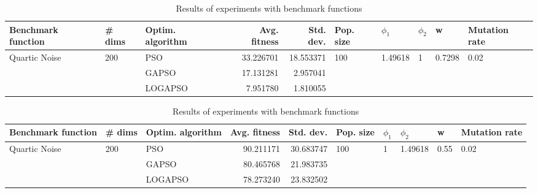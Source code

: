 \documentclass{article}
\begin{document}
\begin{table}
\centering
\caption{Results of experiments with benchmark functions}
\begin{tabular}{lllrrlllll}
\toprule
            Benchmark function &              \# dims & Optim. algorithm &  Avg. fitness &  Std. dev. &            Pop. size &               $\phi_{1}$ &         $\phi_{2}$ &                       w &         Mutation rate \\
\midrule
\multirow{3}{*}{Quartic Noise} & \multirow{3}{*}{200} &              PSO &     33.226701 &  18.553371 & \multirow{3}{*}{100} & \multirow{3}{*}{1.49618} & \multirow{3}{*}{1} & \multirow{3}{*}{0.7298} & \multirow{3}{*}{0.02} \\
                               &                      &            GAPSO &     17.131281 &   2.957041 &                      &                          &                    &                         &                       \\
                               &                      &          LOGAPSO &      7.951780 &   1.810055 &                      &                          &                    &                         &                       \\
\bottomrule
\end{tabular}
\end{table}
\begin{table}
\centering
\caption{Results of experiments with benchmark functions}
\begin{tabular}{lllrrlllll}
\toprule
            Benchmark function &              \# dims & Optim. algorithm &  Avg. fitness &  Std. dev. &            Pop. size &         $\phi_{1}$ &               $\phi_{2}$ &                     w &         Mutation rate \\
\midrule
\multirow{3}{*}{Quartic Noise} & \multirow{3}{*}{200} &              PSO &     90.211171 &  30.683747 & \multirow{3}{*}{100} & \multirow{3}{*}{1} & \multirow{3}{*}{1.49618} & \multirow{3}{*}{0.55} & \multirow{3}{*}{0.02} \\
                               &                      &            GAPSO &     80.465768 &  21.983735 &                      &                    &                          &                       &                       \\
                               &                      &          LOGAPSO &     78.273240 &  23.832502 &                      &                    &                          &                       &                       \\
\bottomrule
\end{tabular}
\end{table}
\end{document}
